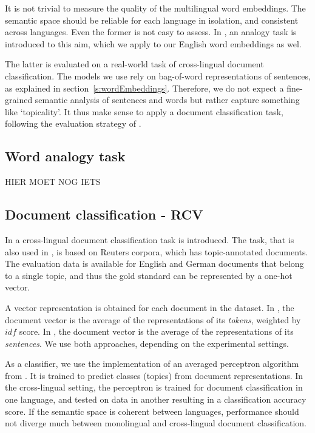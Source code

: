 

It is not trivial to measure the quality of the multilingual word embeddings. The semantic space should be reliable for each language in isolation, and consistent across languages. 
Even the former is not easy to assess. In \cite{mikolov2013efficient}, an analogy task is introduced to this aim, which we apply to our English word embeddings as wel.

The latter is evaluated on a real-world task of cross-lingual document classification. The models we use rely on bag-of-word representations of sentences, as explained in section~\ref{s:wordEmbeddings}. Therefore, we do not expect a fine-grained semantic analysis of sentences and words but rather capture something like `topicality'. It thus make sense to apply a document classification task, following the evaluation strategy of  \cite{klementiev2012inducing, hermann2013multilingual,hermann2014multilingual}.


\subsection{Word analogy task}
{\color{red} HIER MOET NOG IETS}

\subsection{Document classification - RCV}
In \cite{klementiev2012inducing} a cross-lingual document classification task is introduced. The task, that is also used in \cite{hermann2013multilingual}, is based on Reuters corpora, which has topic-annotated documents. The evaluation data is available for English and German documents that belong to a single topic, and thus the gold standard can be represented by a one-hot vector.

A vector representation is obtained for each document in the dataset. In \cite{klementiev2012inducing}, the document vector is the average of the representations of its \emph{tokens}, weighted by $idf$ score. In \cite{hermann2013multilingual}, the document vector is the average of the representations of its \emph{sentences}. We use both approaches, depending on the experimental settings.

As a classifier, we use the implementation of an averaged perceptron algorithm from \cite{klementiev2012inducing}. It is trained to predict classes (topics) from document representations. In the cross-lingual setting, the perceptron is trained for document classification in one language, and tested on data in another resulting in a classification accuracy score. If the semantic space is coherent between languages, performance should not diverge much between monolingual and cross-lingual document classification. 

